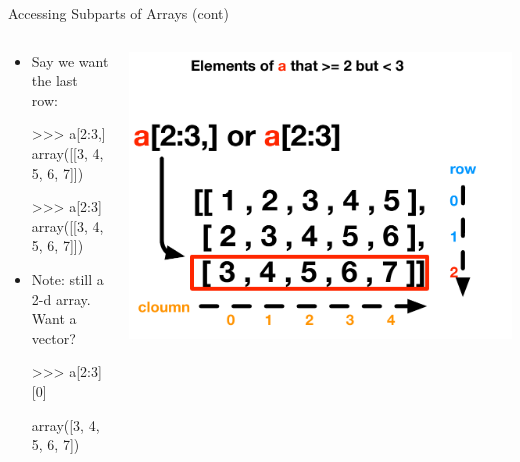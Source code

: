 \documentclass[aspectratio=169]{beamer}
\begin{document}
\begin{frame}[fragile]{Accessing Subparts of Arrays (cont)}

\begin{columns}
\begin{column}{0.5\textwidth}
\begin{itemize}
\item Say we want the last row:

\begin{SQL}
>>> a[2:3,]
array([[3, 4, 5, 6, 7]])

>>> a[2:3]
array([[3, 4, 5, 6, 7]])

\end{SQL}

\item Note: still a 2-d array.  Want a vector?

\begin{SQL}
>>> a[2:3][0]

array([3, 4, 5, 6, 7])
\end{SQL}
\end{itemize}
\end{column}

\begin{column}{0.5\textwidth}
{\centering\includegraphics[width=1\textwidth]{./lectPython/Canvas05.pdf}\par}	
\end{column}

\end{columns}
\end{frame}
\end{document}
